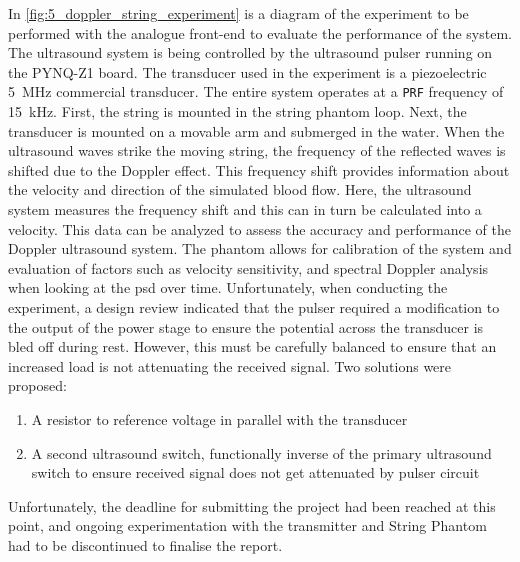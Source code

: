 In \cref{fig:5_doppler_string_experiment} is a diagram of the experiment to be performed with the analogue front-end to evaluate the performance of the system. The ultrasound system is being controlled by the ultrasound pulser running on the PYNQ-Z1 board. The transducer used in the experiment is a piezoelectric \qty{5}{\mega\hertz} commercial transducer. The entire system operates at a \texttt{PRF} frequency of \qty{15}{\kilo\hertz}. First, the string is mounted in the string phantom loop. Next, the transducer is mounted on a movable arm and submerged in the water. When the ultrasound waves strike the moving string, the frequency of the reflected waves is shifted due to the Doppler effect. This frequency shift provides information about the velocity and direction of the simulated blood flow. Here, the ultrasound system measures the frequency shift and this can in turn be calculated into a velocity. This data can be analyzed to assess the accuracy and performance of the Doppler ultrasound system. The phantom allows for calibration of the system and evaluation of factors such as velocity sensitivity, and spectral Doppler analysis when looking at the \gls{psd} over time. Unfortunately, when conducting the experiment, a design review indicated that the pulser required a modification to the output of the power stage to ensure the potential across the transducer is bled off during rest. However, this must be carefully balanced to ensure that an increased load is not attenuating the received signal. Two solutions were proposed:
\begin{enumerate}
	\item A resistor to reference voltage in parallel with the transducer
	\item A second ultrasound switch, functionally inverse of the primary ultrasound switch to ensure received signal does not get attenuated by pulser circuit
\end{enumerate}
Unfortunately, the deadline for submitting the project had been reached at this point, and ongoing experimentation with the transmitter and String Phantom had to be discontinued to finalise the report.